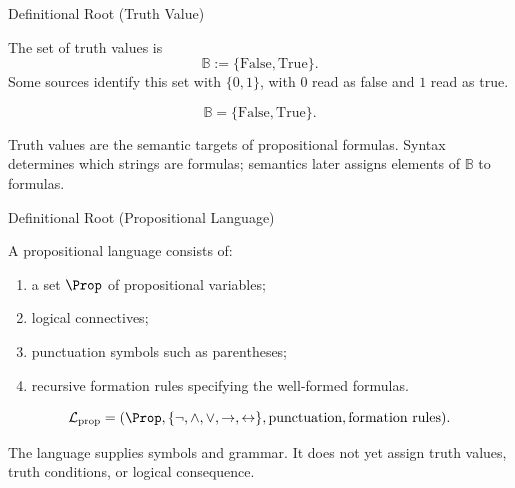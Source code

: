 \begin{definitionalbox}{Definitional Root (Truth Value)}
\begin{definition}
\label{def:truth-value-propositional-logic}
The set of truth values is
\[
\mathbb{B} := \{\mathrm{False},\mathrm{True}\}.
\]
Some sources identify this set with \(\{0,1\}\), with \(0\) read as false and \(1\) read as true.
\end{definition}
\end{definitionalbox}

\begin{remark*}
\[
\mathbb{B}=\{\mathrm{False},\mathrm{True}\}.
\]
\end{remark*}

\begin{remark*}[Interpretation]
Truth values are the semantic targets of propositional formulas. Syntax determines which strings are formulas; semantics later assigns elements of \(\mathbb{B}\) to formulas.
\end{remark*}

\DefinitionalRoot
\begin{definitionalbox}{Definitional Root (Propositional Language)}
\begin{definition}
\label{def:propositional-language}
A propositional language consists of:
\begin{enumerate}
\item a set \(\Prop\) of propositional variables;
\item logical connectives;
\item punctuation symbols such as parentheses;
\item recursive formation rules specifying the well-formed formulas.
\end{enumerate}
\end{definition}
\end{definitionalbox}

\begin{remark*}
\[
\mathcal L_{\mathrm{prop}}
=
(\Prop,\{\neg,\land,\lor,\to,\leftrightarrow\},\text{punctuation},\text{formation rules}).
\]
\end{remark*}

\begin{remark*}[Interpretation]
The language supplies symbols and grammar. It does not yet assign truth values, truth conditions, or logical consequence.
\end{remark*}

